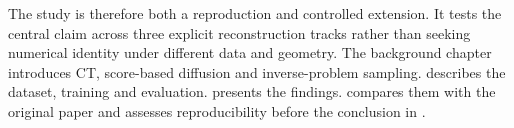 The study is therefore both a reproduction and controlled extension. It tests the central claim across three explicit reconstruction tracks rather than seeking numerical identity under different data and geometry. The background chapter introduces CT, score-based diffusion and inverse-problem sampling.  describes the dataset, training and evaluation.  presents the findings.  compares them with the original paper and assesses reproducibility before the conclusion in .
